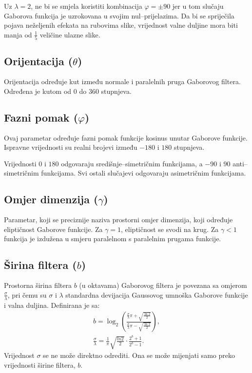 \documentclass{article}
\begin{document}
Uz $\lambda = 2$, ne bi se smjela koristiti kombinacija $\varphi = \pm 90$ jer u
tom slučaju Gaborova funkcija je uzrokovana u svojim
nul--prijelazima.
Da bi se spriječila pojava neželjenih efekata na rubovima slike, vrijednost valne
duljine mora biti manja od $\frac{1}{5}$ veličine ulazne slike.

\subsection{Orijentacija ($\theta$)}
Orijentacija određuje kut između normale i paralelnih pruga Gaborovog
filtera.
Određena je kutom od $0$ do $360$ stupnjeva.

\subsection{Fazni pomak ($\varphi$)}
Ovaj parametar određuje fazni pomak funkcije kosinus unutar Gaborove funkcije.
Ispravne vrijednosti su realni brojevi između $-180$ i $180$ stupnjeva.

Vrijednosti $0$ i $180$ odgovaraju središnje--simetričnim funkcijama, a $-90$ i
$90$ anti--simetričnim funkcijama. Svi ostali slučajevi odgovaraju asimetričnim
funkcijama.

\subsection{Omjer dimenzija ($\gamma $)}
Parametar, koji se preciznije naziva prostorni omjer dimenzija, koji određuje
eliptičnost Gaborove funkcije. Za $\gamma = 1$, eliptičnost se svodi na krug.
Za $\gamma < 1$ funkcija je izdužena u smjeru paralelnom s paralelnim prugama
funkcije.

\subsection{Širina filtera ($b$)}
Prostorna širina filtera $b$ (u oktavama) Gaborovog filtera je povezana sa
omjerom $\frac{\sigma}{\lambda}$, pri čemu su $\sigma$ i $\lambda$ standardna
devijacija Gaussovog umnoška Gaborove funkcije i valna duljina. Definirana je
sa:
\begin{eqnarray}
b = \log_2{\left (  \frac{\frac{\sigma}{\lambda}\pi + \sqrt{\frac{\ln2}{2}}}
{\frac{\sigma}{\lambda}\pi - \sqrt{\frac{\ln2}{2}}} \right )}, \\
\frac{\sigma}{\lambda} =
\frac{1}{\pi}\sqrt{\frac{ln2}{2}}\cdot\frac{2^b+1}{2^b-1}.
\end{eqnarray}
Vrijednost $\sigma$ se ne može direktno odrediti. Ona se može mijenjati samo
preko vrijednosti širine filtera, $b$.
\end{document}
